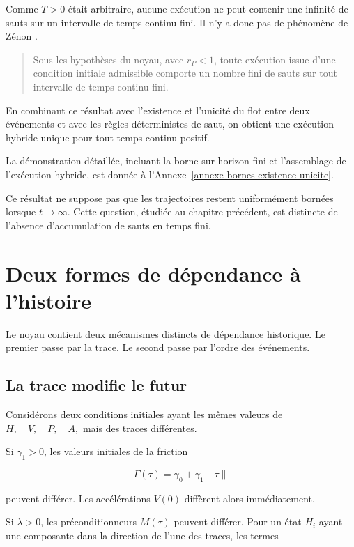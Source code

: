 Comme \(T>0\) était arbitraire, aucune exécution ne peut contenir une infinité de sauts sur un intervalle de temps continu fini. Il n'y a donc pas de phénomène de Zénon \cite{goebel2012hybrid}.

\begin{quote}
Sous les hypothèses du noyau, avec \(r_P<1\), toute exécution issue d'une condition initiale admissible comporte un nombre fini de sauts sur tout intervalle de temps continu fini.
\end{quote}

En combinant ce résultat avec l'existence et l'unicité du flot entre deux événements et avec les règles déterministes de saut, on obtient une exécution hybride unique pour tout temps continu positif.

La démonstration détaillée, incluant la borne sur horizon fini et l'assemblage de l'exécution hybride, est donnée à l'Annexe~\ref{annexe-bornes-existence-unicite}.

Ce résultat ne suppose pas que les trajectoires restent uniformément bornées lorsque \(t\to\infty\). Cette question, étudiée au chapitre précédent, est distincte de l'absence d'accumulation de sauts en temps fini.

\chapter{Deux formes de dépendance à l'histoire}\label{t1-deux-formes-de-dependance-a-lhistoire}

Le noyau contient deux mécanismes distincts de dépendance historique. Le premier passe par la trace. Le second passe par l'ordre des événements.

\section{La trace modifie le futur}\label{t1-la-trace-modifie-le-futur}

Considérons deux conditions initiales ayant les mêmes valeurs de \(H,\quad V,\quad P,\quad A,\) mais des traces différentes.

Si \(\gamma_1>0\), les valeurs initiales de la friction

\[
\Gamma(\tau)
=
\gamma_0+\gamma_1\|\tau\|
\]

peuvent différer. Les accélérations \(\dot V(0)\) diffèrent alors immédiatement.

Si \(\lambda>0\), les préconditionneurs \(M(\tau)\) peuvent différer. Pour un état \(H_i\) ayant une composante dans la direction de l'une des traces, les termes

